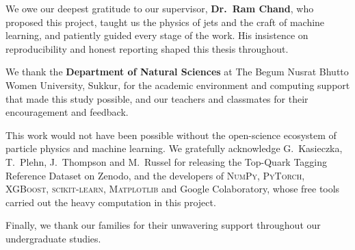 \begin{acknowledgements}
We owe our deepest gratitude to our supervisor, \textbf{Dr.\ Ram Chand},
who proposed this project, taught us the physics of jets and the craft of
machine learning, and patiently guided every stage of the work. His
insistence on reproducibility and honest reporting shaped this thesis
throughout.

We thank the \textbf{Department of Natural Sciences} at The Begum Nusrat
Bhutto Women University, Sukkur, for the academic environment and computing
support that made this study possible, and our teachers and classmates for
their encouragement and feedback.

This work would not have been possible without the open-science ecosystem of
particle physics and machine learning. We gratefully acknowledge
G.~Kasieczka, T.~Plehn, J.~Thompson and M.~Russel for releasing the
Top-Quark Tagging Reference Dataset on Zenodo, and the developers of
\textsc{NumPy}, \textsc{PyTorch}, \textsc{XGBoost}, \textsc{scikit-learn},
\textsc{Matplotlib} and Google Colaboratory, whose free tools carried out
the heavy computation in this project.

Finally, we thank our families for their unwavering support throughout our
undergraduate studies.
\end{acknowledgements}
